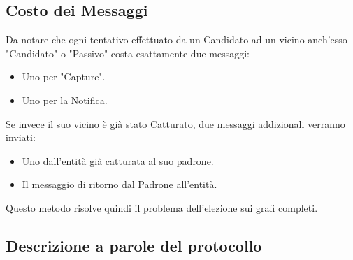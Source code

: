 \subsection{Costo dei Messaggi}
Da notare che ogni tentativo effettuato da un Candidato ad un vicino anch'esso "Candidato" o "Passivo" costa esattamente due messaggi:
\begin{itemize}
    \item Uno per "Capture".
    \item Uno per la Notifica.
\end{itemize}
Se invece il suo vicino è già stato Catturato, due messaggi addizionali verranno inviati:
\begin{itemize}
    \item Uno dall'entità già catturata al suo padrone.
    \item Il messaggio di ritorno dal Padrone all'entità.
\end{itemize}
Questo metodo risolve quindi il problema dell'elezione sui grafi completi.

\subsection{Descrizione a parole del protocollo}

